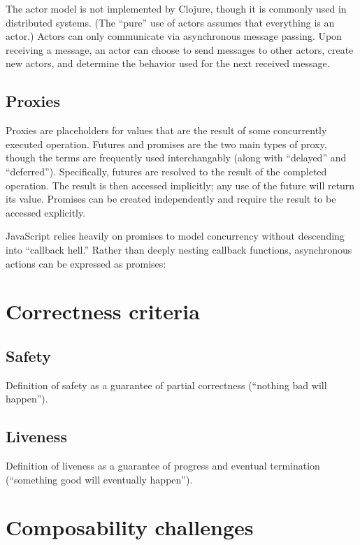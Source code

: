 \documentclass{sig-alternate}
\begin{document}
The actor model is not implemented by Clojure, though it is commonly used in distributed systems. (The ``pure'' use of actors assumes that everything is an actor.) Actors can only communicate via asynchronous message passing. Upon receiving a message, an actor can choose to send messages to other actors, create new actors, and determine the behavior used for the next received message.

\subsection{Proxies}

Proxies are placeholders for values that are the result of some concurrently executed operation. Futures and promises are the two main types of proxy, though the terms are frequently used interchangably (along with ``delayed'' and ``deferred''). Specifically, futures are resolved to the result of the completed operation. The result is then accessed implicitly; any use of the future will return its value. Promises can be created independently and require the result to be accessed explicitly.

JavaScript relies heavily on promises to model concurrency without descending into ``callback hell.'' Rather than deeply nesting callback functions, asynchronous actions can be expressed as promises:

\section{Correctness criteria}

\subsection{Safety}

Definition of safety as a guarantee of partial correctness (``nothing bad will happen'').

\subsection{Liveness}

Definition of liveness as a guarantee of progress and eventual termination (``something good will eventually happen'').

\section{Composability challenges}
\end{document}
